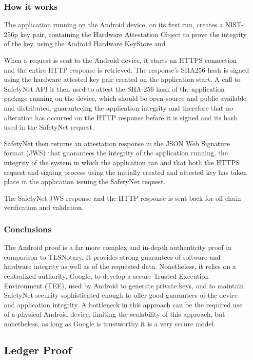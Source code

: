 \subsubsection{How it works}
The application running on the Android device, on its first run, creates a NIST-256p key pair, containing the Hardware Attestation Object to prove the integrity of the key, using the Android Hardware KeyStore and 

When a request is sent to the Android device, it starts an HTTPS connection and the entire HTTP response is retrieved. The response's SHA256 hash is signed using the hardware attested key pair created on the application start. A call to SafetyNet API is then used to attest the SHA-256 hash of the application package running on the device, which should be open-source and public available and distributed, guaranteeing the application integrity and therefore that no alteration has occurred on the HTTP response before it is signed and its hash used in the SafetyNet request.

SafetyNet then returns an attestation response in the JSON Web Signature format (JWS) that guarantees the integrity of the application running, the integrity of the system in which the application ran and that both the HTTPS request and signing process using the initially created and attested key has taken place in the application issuing the SafetyNet request.

The SafetyNet JWS response and the HTTP response is sent back for off-chain verification and validation.

\subsubsection{Conclusions}
The Android proof is a far more complex and in-depth authenticity proof in comparison to TLSNotary. It provides strong guarantees of software and hardware integrity as well as of the requested data. Nonetheless, it relies on a centralized authority, Google, to develop a secure Trusted Execution Environment (TEE), used by Android to generate private keys, and to maintain SafetyNet security sophisticated enough to offer good guarantees of the device and application integrity. A bottleneck in this approach can be the required use of a physical Android device, limiting the scalability of this approach, but nonetheless, as long as Google is trustworthy it is a very secure model. 

\subsection{Ledger Proof}

